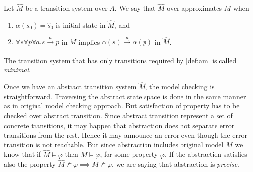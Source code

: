 \begin{definition}\label{def:am}
    Let $\widehat{M}$ be a transition system over $A$. We say that $\widehat{M}$
    over-approximates $M$ when
    \begin{enumerate}
        \item $\alpha(s_0) = \widehat{s}_0$ is initial state in $\widehat{M}$, and
        \item $\forall s\forall p\forall a . s \xrightarrow[]{a} p$ in $M$ implies
            $\alpha(s)
            \xrightarrow[]{a} \alpha(p)$ in $\widehat{M}$.
    \end{enumerate}
\end{definition}

\noindent
The transition system that has only transitions required by \autoref{def:am} is called
\emph{minimal}.

Once we have an abstract transition system $\widehat{M}$, the model checking is
straightforward. Traversing the abstract state space is done in the same manner as
in original model checking approach. But satisfaction of property has to be checked
over abstract transition. Since abstract transition represent a set of concrete
transitions,
it may happen that abstraction does not separate error transitions from the rest.
Hence it may announce an error even though the error transition is not reachable.
But since abstraction includes original model $M$ we know that if $\widehat{M} \models \varphi$
then $M \models \varphi$, for some property $\varphi$. If the abstraction satisfies
also the property $\widehat{M} \not\models \varphi \implies M \not\models \varphi$,
we are saying that abstraction is \emph{precise}.

